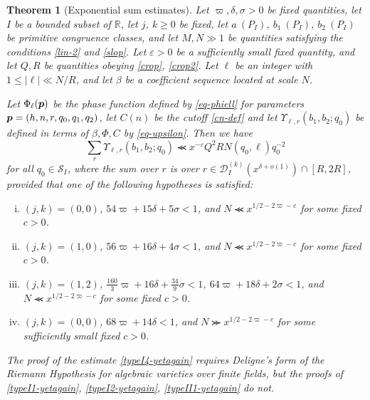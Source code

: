 \documentclass[12pt,a4paper,reqno]{amsart}
\numberwithin{equation}{section}
\theoremstyle{plain}
\newtheorem{theorem}{Theorem}[section]
\theoremstyle{definition}
\newcommand\R{\mathbb{R}}
\newcommand\eps{\varepsilon}
\newcommand\Scal{\mathcal{S}}
\newcommand{\DI}[3]{\mathcal{D}_{{#1}}^{({#2})}({#3})}
\newcommand{\uple}[1]{\text{\boldmath${#1}$}}
\newcommand\sumsum{\mathop{\sum\sum}\limits}
\renewcommand{\sim}{\asymp}
\renewcommand{\lessapprox}{\llcurly}
\renewcommand{\gtrapprox}{\ggcurly}
\begin{document}

\begin{theorem}[Exponential sum estimates]\label{eset}  Let
  $\varpi,\delta,\sigma > 0$ be fixed quantities, let $I$ be a bounded subset
  of $\R$, let $j$, $k\geq 0$ be fixed, let $a\ (P_I)$, $b_1\ (P_I)$,
  $b_2\ (P_I)$ be primitive congruence classes, and let $M,N \gg 1$ be
  quantities satisfying the conditions \eqref{lin-2} and
  \eqref{slop}. Let $\eps>0$ be a sufficiently small fixed quantity,
  and let $Q,R$ be quantities obeying \eqref{crop}, \eqref{crop2}. Let
  $\ell$ be an integer with $1\leq |\ell|\ll N/R$, and let $\beta$ be a
  coefficient sequence located at scale $N$.
\par
Let $\Phi_{\ell}(\uple{p})$ be the phase function defined by
\eqref{eq-phiell} for parameters $\uple{p}=(h,n,r,q_0,q_1,q_2)$, let $C(n)$ be the cutoff \eqref{cn-def} and let $\Upsilon_{\ell,r}(b_1,b_2;q_0)$ be defined in terms of $\beta, \Phi, C$ by \eqref{eq-upsilon}.  Then
we have
\begin{equation}\label{keyo}
  \sum_{r}\Upsilon_{\ell,r}(b_1,b_2;q_0)
  \lessapprox x^{-\eps} Q^2R N  (q_0,\ell)q_0^{-2}
\end{equation}
for all $q_0 \in \Scal_I$, where the sum over $r$ is over
$r\in \DI{I}{k}{x^{\delta+o(1)}} \cap [R,2R]$, provided that one of
the following hypotheses is satisfied:
\begin{enumerate}[(i)]
\item\label{typeI1-yetagain} $(j,k) = (0,0)$, $54\varpi + 15\delta + 5 \sigma < 1$, and $N \lessapprox x^{1/2-2\varpi-c}$ for some fixed $c>0$.
\item\label{typeI2-yetagain} $(j,k) = (1,0)$, $56\varpi + 16\delta + 4 \sigma < 1$, and $N \lessapprox x^{1/2-2\varpi-c}$ for some fixed $c>0$.
\item\label{typeI4-yetagain} $(j,k) = (1,2)$, $\frac{160}{3} \varpi + 16\delta + \frac{34}{9} \sigma < 1$, $64\varpi + 18 \delta + 2\sigma < 1$, and $N \lessapprox x^{1/2-2\varpi-c}$ for some fixed $c>0$.
\item\label{typeII1-yetagain} $(j,k)=(0,0)$, $68\varpi + 14 \delta < 1$, and $N \gtrapprox x^{1/2-2\varpi-c}$ for some sufficiently small fixed $c>0$.
\end{enumerate}
The proof of the estimate \eqref{typeI4-yetagain} requires
Deligne's form of the Riemann Hypothesis for algebraic varieties over
finite fields, but the proofs of \eqref{typeI1-yetagain},
\eqref{typeI2-yetagain}, \eqref{typeII1-yetagain} do not.
\end{theorem}
\end{document}

